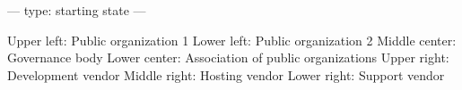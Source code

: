 ---
type: starting state
---

Upper left: Public organization 1
Lower left: Public organization 2
Middle center: Governance body
Lower center: Association of public organizations
Upper right: Development vendor
Middle right: Hosting vendor
Lower right: Support vendor
